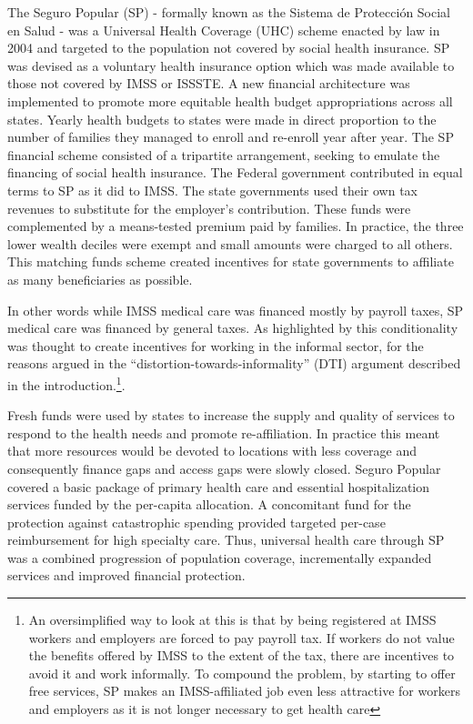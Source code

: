 \documentclass[oneside,11pt]{article}
\begin{document}
The Seguro Popular (SP) - formally known as the Sistema de Protección Social en Salud - was a Universal Health Coverage (UHC) scheme enacted by law in 2004 and targeted to the population not covered by social health insurance. SP was devised as a voluntary health insurance option which was made available to those not covered by IMSS or ISSSTE. A new financial architecture was implemented to promote more equitable health budget appropriations across all states.  Yearly health budgets to states were made in direct proportion to the number of families they managed to enroll and re-enroll year after year.   The SP financial scheme consisted of a tripartite arrangement, seeking to emulate the financing of social health insurance. The Federal government  contributed in equal terms to SP as it did to IMSS. The state governments used their own tax revenues to substitute for the employer's contribution. These funds were complemented by a means-tested premium paid by families. In practice, the three lower wealth deciles were exempt and small amounts were charged to all others. This matching funds scheme created incentives for state governments to affiliate as many beneficiaries as possible.  

In other words while IMSS medical care was financed mostly by payroll taxes, SP medical care was financed by general taxes. As highlighted by \cite{Levy_2008} this conditionality was thought to create incentives for working in the informal sector, for the reasons argued in the ``distortion-towards-informality'' (DTI) argument described in the introduction.\footnote{An oversimplified  way to look at this is that by being registered at IMSS workers and employers are forced to pay payroll tax. If workers do not value the benefits offered by IMSS to the extent of the tax, there are incentives to avoid it and work informally. To compound the problem, by starting to offer free services, SP makes an IMSS-affiliated job even less  attractive for workers and employers as it is not longer necessary to get health care}.

Fresh funds were used by states to increase the supply and quality of services to respond to the health needs and promote re-affiliation. In practice this meant that more resources would be devoted to locations with less coverage and consequently finance gaps and access gaps were slowly closed. Seguro Popular covered a basic package of primary health care and essential hospitalization services funded by the per-capita allocation. A concomitant fund for the protection against catastrophic spending provided targeted per-case reimbursement for high specialty care. Thus, universal health care through SP was a combined progression of population coverage, incrementally expanded services and improved financial protection. 
\end{document}
